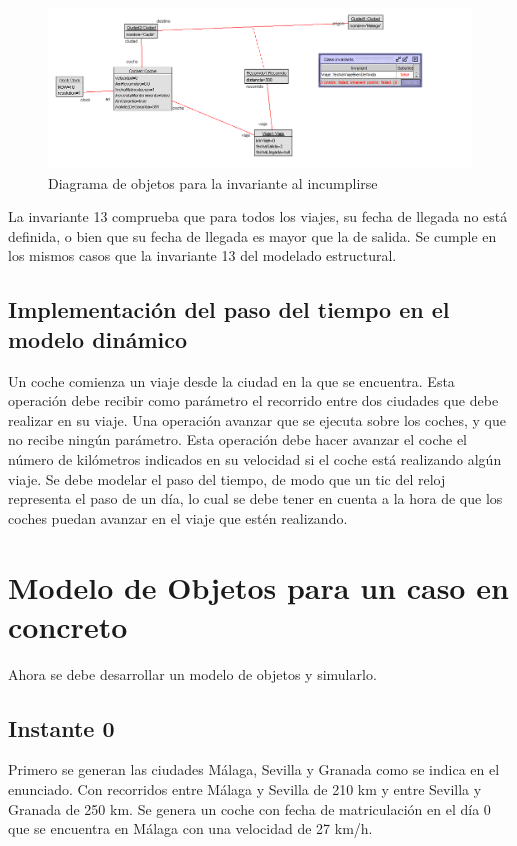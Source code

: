 \documentclass[12pt.a4paper]{article}
\begin{document}
\begin{figure}[H]
     \includegraphics[width=1\linewidth]{Soils/dinamico_inv13_false.png}
     \caption{Diagrama de objetos para la invariante al incumplirse}
\end{figure}

La invariante 13 comprueba que para todos los viajes, su fecha de llegada no está definida, o bien que su fecha de llegada es mayor que la de salida. Se cumple en los mismos casos que la invariante 13 del modelado estructural.

    
\subsection{Implementación del paso del tiempo en el modelo dinámico}
Un coche comienza un viaje desde la ciudad en la que se encuentra. Esta operación debe recibir como parámetro el recorrido entre dos ciudades que debe realizar en su viaje.
Una operación avanzar que se ejecuta sobre los coches, y que no recibe ningún parámetro. Esta operación debe hacer avanzar el coche el número de kilómetros indicados en su velocidad si el coche está realizando algún viaje. Se debe modelar el paso del tiempo, de modo que un tic del reloj representa el paso de un día, lo cual se debe tener en cuenta a la hora de que los coches puedan avanzar en el viaje que estén realizando.

\section{Modelo de Objetos para un caso en concreto}
Ahora se debe desarrollar un modelo de objetos y simularlo.


\subsection{Instante 0}
Primero se generan las ciudades Málaga, Sevilla y Granada como se indica en el enunciado. Con recorridos entre Málaga y Sevilla de 210 km y entre Sevilla y Granada de 250 km. Se genera un coche con fecha de matriculación en el día 0 que se encuentra en Málaga con una velocidad de 27 km/h.
\end{document}
